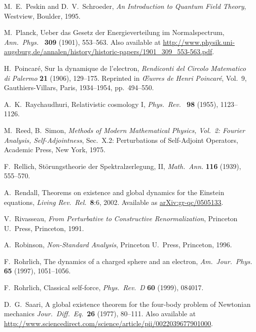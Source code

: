 \documentclass[12pt]{article}
\begin{document}
\begin{thebibliography}{10}
 M.\ E.\ Peskin and D.\ V.\ Schroeder, \textsl{An Introduction
to Quantum Field Theory}, Westview, Boulder, 1995.

 M.\ Planck, Ueber das Gesetz der Energieverteilung im Normalspectrum, \textsl{Ann.\ Phys.\ } \textbf{309} (1901), 553--563.  Also available at \href{http://www.physik.uni-augsburg.de/annalen/history/historic-papers/1901_309_553-563.pdf}{http://www.physik.uni-augsburg.de/annalen/history/historic-papers/1901\_309\_553-563.pdf}.

 H.\ Poincar\'e, Sur la dynamique de l'electron, \textsl{Rendiconti del Circolo Matematico di Palermo} {\bf 21} (1906), 129--175.  Reprinted in \textsl{\OE uvres de Henri Poincar\'e}, Vol.\ 9, Gauthiers-Villars, Paris, 1934--1954, pp.\ 494--550.

 A.\ K.\ Raychaudhuri, Relativistic cosmology I, \textsl{Phys.\ Rev.\ } \textbf{98} (1955), 1123--1126.

 M.\ Reed, B.\ Simon, \textsl{Methods of Modern Mathematical Physics, Vol.\ 2: Fourier Analysis, Self-Adjointness}, Sec.\ X.2: Perturbations of Self-Adjoint Operators, Academic Press, New York, 1975.

 F.\ Rellich, St\"orungstheorie der Spektralzerlegung, II, \textit{Math.\ Ann.} {\bf 116} (1939), 555--570. 

 A.\ Rendall, Theorems on existence and global dynamics for the Einstein equations, \textsl{Living Rev.\ Rel.\ }\textbf{8}:6, 2002.  Available as \href{http://arxiv.org/abs/gr-qc/0505133}{arXiv:gr-qc/0505133}.

 V.\ Rivasseau, \textsl{From Perturbative to Constructive Renormalization}, Princeton U.\ Press, Princeton, 1991.

 A.\ Robinson, \textsl{Non-Standard Analysis}, Princeton U.\ Press, Princeton, 1996.

 F.\ Rohrlich, The dynamics of a charged sphere and an electron,
\textsl{Am.\ Jour.\ Phys.} {\bf 65} (1997), 1051--1056.

 F.\ Rohrlich, Classical self-force, \textsl{Phys.\ Rev.\ D} {\bf 60} (1999), 084017.

 D.\ G.\ Saari, A global existence theorem for the four-body problem of Newtonian mechanics  \textsl{Jour.\ Diff.\ Eq.\ }{\bf 26} (1977), 80--111.  Also available
at \href{http://www.sciencedirect.com/science/article/pii/0022039677901000}{http://www.sciencedirect.com/science/article/pii/0022039677901000}.


\end{thebibliography}
\end{document}
